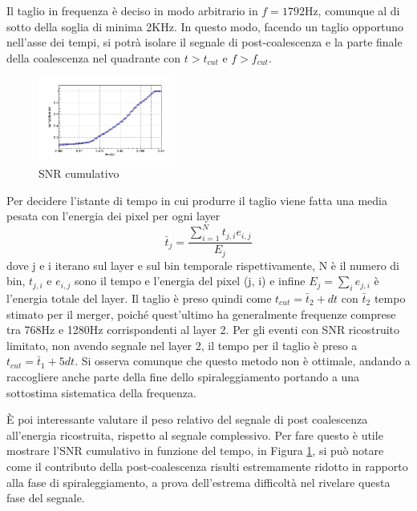 Il taglio in frequenza è deciso in modo arbitrario in $f = 1792$Hz, comunque al di sotto della soglia di minima 2KHz. In questo modo, facendo un taglio opportuno nell'asse dei tempi, si potrà isolare il segnale di post-coalescenza e la parte finale della coalescenza nel quadrante con $t>t_{cut}$ e $f>f_{cut}$. \\ 
\begin{figure}
	\vspace{-30pt}
	\begin{center}
		\includegraphics[width=0.4\textwidth]{figures/Capitolo_4/dump/501/V1_snr_cum_SHTdfdt_501.png}
	\end{center}
	\vspace{-8pt}
	\caption{SNR cumulativo}
	\label{fig:snr_cum}
	\vspace{-10pt}
\end{figure}
Per decidere l'istante di tempo in cui produrre il taglio viene fatta una media pesata con l'energia dei pixel per ogni layer
\begin{equation}
	\bar{t}_j = \frac{\sum_{i=1}^Nt_{j,i}e_{i,j}}{E_{j}}
\end{equation}
dove j e i iterano sul layer e sul bin temporale rispettivamente, N è il numero di bin, $t_{j,i}$ e $e_{i,j}$ sono il tempo e l'energia del pixel (j, i) e infine $E_{j} = \sum_{i}e_{j,i}$ è l'energia totale del layer. Il taglio è preso quindi come $t_{cut} = \bar{t}_2 + dt$ con $\bar{t}_2$ tempo stimato per il merger, poiché quest'ultimo ha generalmente frequenze comprese tra 768Hz e 1280Hz corrispondenti al layer 2. Per gli eventi con SNR ricostruito limitato, non avendo segnale nel layer 2, il tempo per il taglio è preso a $t_{cut} = \bar{t}_1 + 5dt$. Si osserva comunque che questo metodo non è ottimale, andando a raccogliere anche parte della fine dello spiraleggiamento portando a una sottostima sistematica della frequenza.

È poi interessante valutare il peso relativo del segnale di post coalescenza all'energia ricostruita, rispetto al segnale complessivo. Per fare questo è utile mostrare l'SNR cumulativo in funzione del tempo, in Figura \ref{fig:snr_cum}, si può notare come il contributo della post-coalescenza risulti estremamente ridotto in rapporto alla fase di spiraleggiamento, a prova dell'estrema difficoltà nel rivelare questa fase del segnale.


